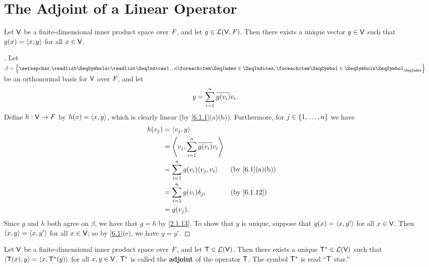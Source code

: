 \section{The Adjoint of a Linear Operator}\label{sec:6.3}

\begin{thm}\label{6.8}
  Let \(\mathsf{V}\) be a finite-dimensional inner product space over \(\mathit{F}\), and let \(g \in \mathcal{L}(\mathsf{V}, \mathit{F})\).
  Then there exists a unique vector \(y \in \mathsf{V}\) such that \(g(x) = \left\langle x, y\right\rangle\) for all \(x \in \mathsf{V}\).
\end{thm}

\begin{proof}[]
  Let \(\beta = \set{\seq{v}{1,,n}}\) be an orthonormal basis for \(\mathsf{V}\) over \(\mathit{F}\), and let
  \[
    y = \sum_{i = 1}^n \overline{g(v_i)} v_i.
  \]
  Define \(h : \mathsf{V} \to \mathit{F}\) by \(h(x) = \left\langle x, y\right\rangle\), which is clearly linear (by \cref{6.1.1}(a)(b)).
  Furthermore, for \(j \in \left\lbrace1, \dots, n\right\rbrace\) we have
  \begin{align*}
    h(v_j) & = \inn{v_j, y}                                                                  \\
           & = \inn{v_j, \sum_{i = 1}^n \conj{g(v_i)} v_i}                                   \\
           & = \sum_{i = 1}^n g(v_i) \inn{v_j, v_i}        &  & \text{(by \cref{6.1}(a)(b))} \\
           & = \sum_{i = 1}^n g(v_i) \delta_{j i}          &  & \text{(by \cref{6.1.12})}    \\
           & = g(v_j).
  \end{align*}
  Since \(g\) and \(h\) both agree on \(\beta\), we have that \(g = h\) by \cref{2.1.13}.
  To show that \(y\) is unique, suppose that \(g(x) = \left\langle x, y'\right\rangle\) for all \(x \in \mathsf{V}\).
  Then \(\left\langle x, y\right\rangle = \left\langle x, y'\right\rangle\) for all \(x \in \mathsf{V}\);
  so by \cref{6.1}(e), we have \(y = y'\).
\end{proof}

\begin{thm}\label{6.9}
  Let \(\mathsf{V}\) be a finite-dimensional inner product space over \(\mathit{F}\), and let \(\mathsf{T} \in \mathcal{L}(\mathsf{V})\).
  Then there exists a unique \(\mathsf{T}^* \in \mathcal{L}(\mathsf{V})\) such that \(\left\langle\mathsf{T}(x), y\right\rangle = \left\langle x, \mathsf{T}^*(y)\right\rangle\) for all \(x, y \in \mathsf{V}\).
  \(\mathsf{T}^*\) is called the \textbf{adjoint} of the operator \(\mathsf{T}\).
  The symbol \(\mathsf{T}^*\) is read ``\(\mathsf{T}\) star.''
\end{thm}

